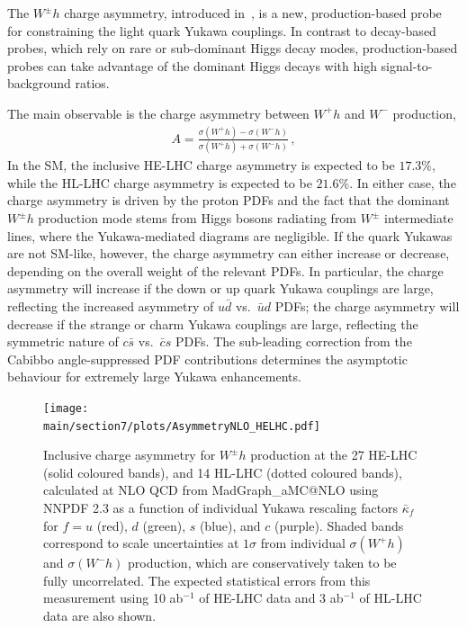 \documentclass[../report.tex]{subfiles}
\providecommand{\main}{..}
\begin{document}

The $W^\pm h$ charge asymmetry, introduced in~\cite{Yu:2016rvv}, is a
new, production-based probe for constraining the light quark Yukawa
couplings.  In contrast to decay-based probes, which rely on rare or
sub-dominant Higgs decay modes, production-based probes can take
advantage of the dominant Higgs decays with high signal-to-background
ratios.  

The main observable is the charge asymmetry between $W^+ h$ and $W^-$
production,
%
\begin{align}
	A 
= 	\frac{ \sigma (W^+ h) - \sigma (W^- h)}
	{\sigma (W^+ h) + \sigma (W^- h) } \, ,
\end{align}
%
In the SM, the inclusive HE-LHC charge asymmetry is expected to be $17.3\%$, while the HL-LHC charge asymmetry is expected to be $21.6\%$.  In either
case, the charge asymmetry is driven by the proton PDFs and the fact
that the dominant $W^\pm h$ production mode stems from Higgs bosons
radiating from $W^\pm$ intermediate lines, where the Yukawa-mediated
diagrams are negligible.  If the quark Yukawas are not SM-like,
however, the charge asymmetry can either increase or decrease,
depending on the overall weight of the relevant PDFs.  In particular,
the charge asymmetry will increase if the down or up quark Yukawa
couplings are large, reflecting the increased asymmetry of $u \bar{d}$
vs.~$\bar{u} d$ PDFs; the charge asymmetry will decrease if the
strange or charm Yukawa couplings are large, reflecting the symmetric
nature of $c \bar{s}$ vs.~$\bar{c} s$ PDFs.  The sub-leading correction
from the Cabibbo angle-suppressed PDF contributions determines the
asymptotic behaviour for extremely large Yukawa enhancements.

\begin{figure}[tb!]
  \begin{center}
 \texttt{[image: \\main/section7/plots/AsymmetryNLO\_HELHC.pdf]}
 \caption{Inclusive charge asymmetry for $W^\pm h$ production at the
   27 \UTeV HE-LHC (solid coloured bands), and 14 \UTeV HL-LHC (dotted
   coloured bands), calculated at NLO QCD from MadGraph\_aMC@NLO using
   NNPDF 2.3 as a function of individual Yukawa rescaling factors
   $\bar{\kappa}_f$ for $f = u$ (red), $d$ (green), $s$ (blue), and
   $c$ (purple).  Shaded bands correspond to scale uncertainties at
   $1\sigma$ from individual $\sigma(W^+ h)$ and $\sigma(W^- h)$
   production, which are conservatively taken to be fully
   uncorrelated.  The expected statistical errors from this
   measurement using 10 ab$^{-1}$ of HE-LHC data and 3 ab$^{-1}$ of
   HL-LHC data are also shown.}
  \label{fig:asymmetry}
  \end{center}
\end{figure}
\end{document}
